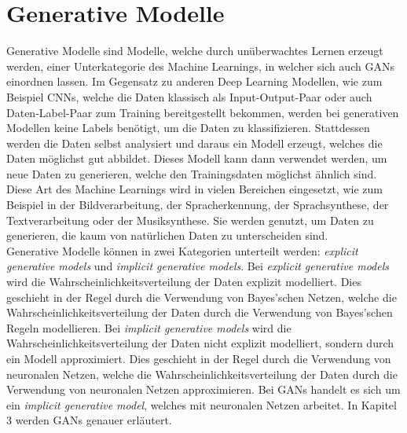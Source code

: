 \section{Generative Modelle}

\noindent Generative Modelle sind Modelle, welche durch unüberwachtes Lernen erzeugt werden, einer Unterkategorie des Machine Learnings, in welcher sich auch \acp{GAN} einordnen lassen. Im Gegensatz zu anderen Deep Learning Modellen, wie zum Beispiel \acfp{CNN}, welche die Daten klassisch als Input-Output-Paar oder auch Daten-Label-Paar zum Training bereitgestellt bekommen, werden bei generativen Modellen keine Labels benötigt, um die Daten zu klassifizieren. Stattdessen werden die Daten selbst analysiert und daraus ein Modell erzeugt, welches die Daten möglichst gut abbildet. Dieses Modell kann dann verwendet werden, um neue Daten zu generieren, welche den Trainingsdaten möglichst ähnlich sind.\cite{mlbook}\\

\noindent Diese Art des Machine Learnings wird in vielen Bereichen eingesetzt, wie zum Beispiel in der Bildverarbeitung, der Spracherkennung, der Sprachsynthese, der Textverarbeitung oder der Musiksynthese. Sie werden genutzt, um Daten zu generieren, die kaum von natürlichen Daten zu unterscheiden sind. \\

\noindent Generative Modelle können in zwei Kategorien unterteilt werden: \textit{explicit generative models} und \textit{implicit generative models}. Bei \textit{explicit generative models} wird die Wahrscheinlichkeitsverteilung der Daten explizit modelliert. Dies geschieht in der Regel durch die Verwendung von Bayes'schen Netzen, welche die Wahrscheinlichkeitsverteilung der Daten durch die Verwendung von Bayes'schen Regeln modellieren. Bei \textit{implicit generative models} wird die Wahrscheinlichkeitsverteilung der Daten nicht explizit modelliert, sondern durch ein Modell approximiert. Dies geschieht in der Regel durch die Verwendung von neuronalen Netzen, welche die Wahrscheinlichkeitsverteilung der Daten durch die Verwendung von neuronalen Netzen approximieren. Bei \acp{GAN} handelt es sich um ein \textit{implicit generative model}, welches mit neuronalen Netzen arbeitet. In Kapitel 3 werden \acp{GAN} genauer erläutert.\\


\newpage